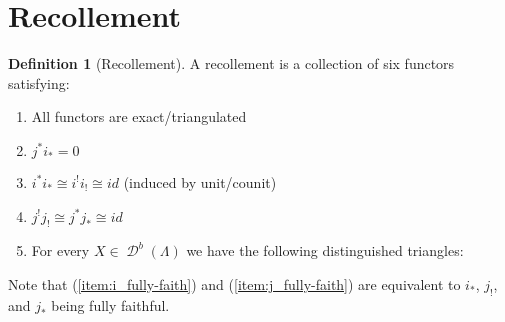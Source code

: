 \documentclass[11pt, a4paper, english]{article}
\theoremstyle{definition}
\newtheorem{defn}[theorem]{Definition}
\DeclareMathOperator{\D}{\mathcal{D}}
\begin{document}
\section{Recollement}
\begin{defn}[Recollement]\label{def:recollement}
	A recollement is a collection of six functors satisfying:
\begin{center}
\end{center}

\begin{enumerate}
	\item All functors are exact/triangulated
	\item $j^*i_*=0$
	\item $i^*i_* \cong i^!i_! \cong id$ (induced by unit/counit) \label{item:i_fully-faith}
	\item $j^!j_! \cong j^*j_* \cong id$ \label{item:j_fully-faith}
	\item \label{recollement:triangles}
	For every $X \in \D^b(\Lambda)$ we have the following distinguished triangles:
	\begin{center}
	\end{center}
\end{enumerate}
Note that (\ref{item:i_fully-faith}) and (\ref{item:j_fully-faith}) are equivalent to $i_*$, $j_!$, and $j_*$ being fully faithful.
\end{defn}
\end{document}
